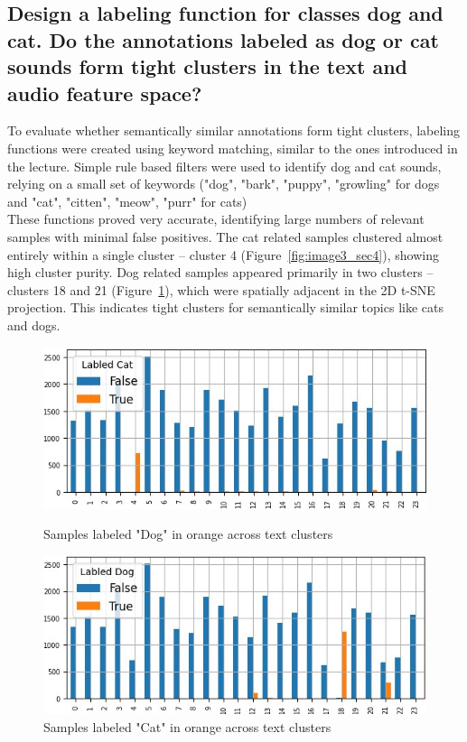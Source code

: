 \subsection{Design a labeling function for classes dog and cat. Do the annotations labeled as dog or cat sounds
form tight clusters in the text and audio feature space?}
\label{sec:Text Features:b}

To evaluate whether semantically similar annotations form tight clusters, labeling functions were created using keyword matching, similar to the ones introduced in the lecture. Simple rule based filters were used to identify dog and cat sounds, relying on a small set of keywords ("dog", "bark", "puppy", "growling" for dogs and "cat", "citten", "meow", "purr" for cats)\\
These functions proved very accurate, identifying large numbers of relevant samples with minimal false positives. The cat related samples clustered almost entirely within a single cluster -- cluster 4 (Figure~\ref{fig:image3_sec4}), showing high cluster purity. Dog related samples appeared primarily in two clusters -- clusters 18 and 21 (Figure~\ref{fig:image4_sec4}), which were spatially adjacent in the 2D t-SNE projection. This indicates tight clusters for semantically similar topics like cats and dogs.
\begin{figure}[ht]
  \centering
  \begin{minipage}[b]{0.49\textwidth}
    \centering
    \includegraphics[width=\textwidth]{figs/cat_text_cluster.jpg}
    \caption{Samples labeled "Dog" in orange across text clusters}
    \label{fig:image3_sec4}
  \end{minipage}
  \hfill
  \begin{minipage}[b]{0.49\textwidth}
    \centering
    \includegraphics[width=\textwidth]{figs/dog_text_cluster.jpg}
    \caption{Samples labeled "Cat" in orange across text clusters}
    \label{fig:image4_sec4}
  \end{minipage}
\end{figure}


